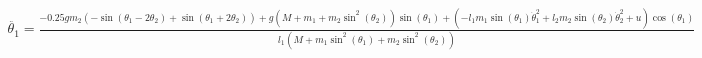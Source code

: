 \documentclass[preview]{standalone}
\begin{document}
\begin{align*}
\ddot{\theta_1} = \frac{- 0.25 g m_{2} \left(- \operatorname{sin}\left(\theta_{1} - 2 \theta_{2}\right) + \operatorname{sin}\left(\theta_{1} + 2 \theta_{2}\right)\right) + g \left(M + m_{1} + m_{2} \operatorname{sin}^{2}\left(\theta_{2}\right)\right) \operatorname{sin}\left(\theta_{1}\right) + \left(- l_{1} m_{1} \operatorname{sin}\left(\theta_{1}\right) \dot{\theta}_{1}^{2} + l_{2} m_{2} \operatorname{sin}\left(\theta_{2}\right) \dot{\theta}_{2}^{2} + u\right) \operatorname{cos}\left(\theta_{1}\right)}{l_{1} \left(M + m_{1} \operatorname{sin}^{2}\left(\theta_{1}\right) + m_{2} \operatorname{sin}^{2}\left(\theta_{2}\right)\right)}
\end{align*}
\end{document}
